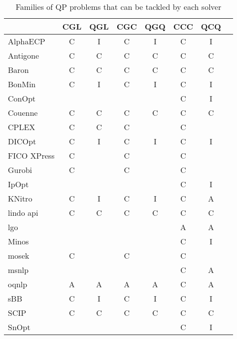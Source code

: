 \begin{table}
{
 \centering                
 \scriptsize                
 \setlength{\tabcolsep}{3pt}                
                
\begin{tabular}{lccccccc}
\toprule  
                 & CGL & QGL & CGC & QGQ & CCC & QCQ \\
\hline
{\sc AlphaECP}    &  C  &  I  &  C  &  I  &  C  &  I  \\
{\sc Antigone}    &  C  &  C  &  C  &  C  &  C  &  C  \\
{\sc Baron}       &  C  &  C  &  C  &  C  &  C  &  C  \\
{\sc BonMin}      &  C  &  I  &  C  &  I  &  C  &  I  \\
{\sc ConOpt}      &     &     &     &     &  C  &  I  \\
{\sc Couenne}     &  C  &  C  &  C  &  C  &  C  &  C  \\
{\sc CPLEX}       &  C  &  C  &  C  &     &  C  &     \\
{\sc DICOpt}      &  C  &  I  &  C  &  I  &  C  &  I  \\
{\sc FICO XPress} &  C  &     &  C  &     &  C  &     \\
{\sc Gurobi}      &  C  &     &  C  &     &  C  &     \\
{\sc IpOpt}       &     &     &     &     &  C  &  I  \\
{\sc KNitro}      &  C  &  I  &  C  &  I  &  C  &  A  \\
{\sc lindo api}   &  C  &  C  &  C  &  C  &  C  &  C  \\
{\sc lgo}         &     &     &     &     &  A  &  A  \\
{\sc Minos}       &     &     &     &     &  C  &  I  \\
{\sc mosek}       &  C  &     &  C  &     &  C  &     \\
{\sc msnlp}       &     &     &     &     &  C  &  A  \\
{\sc oqnlp}       &  A  &  A  &  A  &  A  &  C  &  A  \\
{\sc sBB}         &  C  &  I  &  C  &  I  &  C  &  I  \\
{\sc SCIP}        &  C  &  C  &  C  &  C  &  C  &  C  \\
{\sc SnOpt}       &     &     &     &     &  C  &  I  \\
\hline
\end{tabular}                 
\caption{Families of QP problems that can be tackled by each solver} \label{t:solvers}
}


\end{table}              

